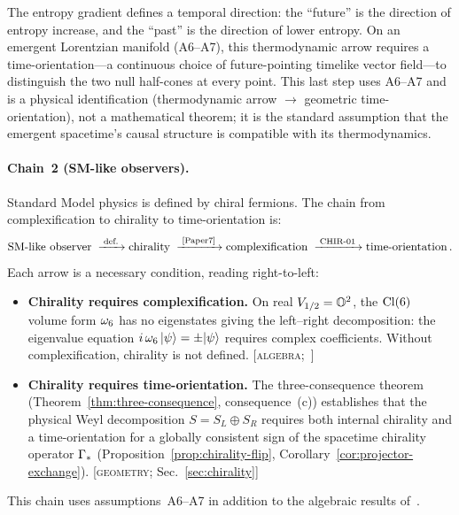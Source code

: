 The entropy gradient defines a temporal direction: the ``future'' is
the direction of entropy increase, and the ``past'' is the direction
of lower entropy.  On an emergent Lorentzian manifold (A6--A7), this
thermodynamic arrow requires a time-orientation---a continuous choice
of future-pointing timelike vector field---to distinguish the two
null half-cones at every point.  This last step uses A6--A7 and is
a physical identification (thermodynamic arrow $\to$ geometric
time-orientation), not a mathematical theorem; it is the standard
assumption that the emergent spacetime's causal structure is
compatible with its thermodynamics.

\paragraph{Chain~2 (SM-like observers).}
Standard Model physics is defined by chiral fermions.  The chain
from complexification to chirality to time-orientation is:
\begin{equation}
  \text{SM-like observer}
  \;\xrightarrow{\;\text{def.}\;}
  \text{chirality}
  \;\xrightarrow{\;\text{\cite{Paper7}}\;}
  \text{complexification}
  \;\xrightarrow{\;\text{CHIR-01}\;}
  \text{time-orientation} \,.
  \label{eq:chain-2}
\end{equation}
Each arrow is a necessary condition, reading right-to-left:
\begin{itemize}
  \item \textbf{Chirality requires complexification.}
    On real $V_{1/2} = \mathbb{O}^2$, the $\mathrm{Cl}(6)$ volume form
    $\omega_6$ has no eigenstates giving the left--right
    decomposition: the eigenvalue equation
    $i\,\omega_6\,| \psi \rangle = \pm| \psi \rangle$ requires complex
    coefficients.  Without complexification, chirality is not
    defined.
    \hfill[\textsc{algebra};~\cite{Paper7}]

  \item \textbf{Chirality requires time-orientation.}
    The three-consequence theorem
    (Theorem~\ref{thm:three-consequence}, consequence~(c))
    establishes that the physical Weyl decomposition
    $S = S_L \oplus S_R$ requires both internal chirality and
    a time-orientation for a globally consistent sign of the
    spacetime chirality operator $\Gamma_*$
    (Proposition~\ref{prop:chirality-flip},
    Corollary~\ref{cor:projector-exchange}).
    \hfill[\textsc{geometry}; Sec.~\ref{sec:chirality}]
\end{itemize}
This chain uses assumptions~A6--A7 in addition to the algebraic
results of~\cite{Paper7}.


